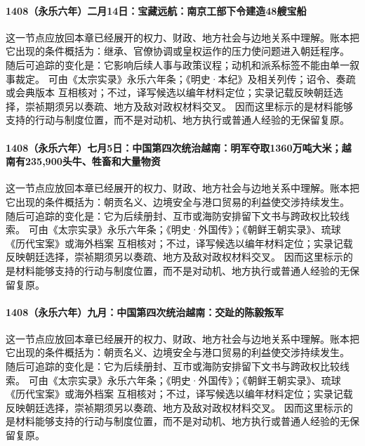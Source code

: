 \paragraph{1408（永乐六年）二月14日：宝藏远航：南京工部下令建造48艘宝船} 这一节点应放回本章已经展开的权力、财政、地方社会与边地关系中理解。账本把它出现的条件概括为：继承、官僚协调或皇权运作的压力使问题进入朝廷程序。 随后可追踪的变化是：它影响后续人事与政策议程；动机和派系标签不能由单一叙事裁定。 可由《太宗实录》永乐六年条；《明史·本纪》及相关列传；诏令、奏疏或会典版本 互相核对；不过，译写候选以编年材料定位；实录记载反映朝廷选择，崇祯期须另以奏疏、地方及敌对政权材料交叉。 因而这里标示的是材料能够支持的行动与制度位置，而不是对动机、地方执行或普通人经验的无保留复原。

\paragraph{1408（永乐六年）七月5日：中国第四次统治越南：明军夺取1360万吨大米；越南有235,900头牛、牲畜和大量物资} 这一节点应放回本章已经展开的权力、财政、地方社会与边地关系中理解。账本把它出现的条件概括为：朝贡名义、边境安全与港口贸易的利益使交涉持续发生。 随后可追踪的变化是：它为后续册封、互市或海防安排留下文书与跨政权比较线索。 可由《太宗实录》永乐六年条；《明史·外国传》；《朝鲜王朝实录》、琉球《历代宝案》或海外档案 互相核对；不过，译写候选以编年材料定位；实录记载反映朝廷选择，崇祯期须另以奏疏、地方及敌对政权材料交叉。 因而这里标示的是材料能够支持的行动与制度位置，而不是对动机、地方执行或普通人经验的无保留复原。

\paragraph{1408（永乐六年）九月：中国第四次统治越南：交趾的陈毅叛军} 这一节点应放回本章已经展开的权力、财政、地方社会与边地关系中理解。账本把它出现的条件概括为：朝贡名义、边境安全与港口贸易的利益使交涉持续发生。 随后可追踪的变化是：它为后续册封、互市或海防安排留下文书与跨政权比较线索。 可由《太宗实录》永乐六年条；《明史·外国传》；《朝鲜王朝实录》、琉球《历代宝案》或海外档案 互相核对；不过，译写候选以编年材料定位；实录记载反映朝廷选择，崇祯期须另以奏疏、地方及敌对政权材料交叉。 因而这里标示的是材料能够支持的行动与制度位置，而不是对动机、地方执行或普通人经验的无保留复原。
